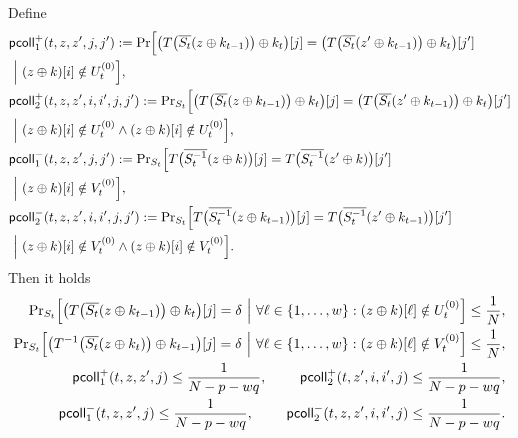 \begin{lemma}
	\label{lemma:coll-prob}
	
	Define
	\begin{align*}
	&\mathsf{pcoll}_{1}^+(t,z,z',j,j')  :={\Pr}\Big[\big(T\big(\overline{S_t}(z\oplus k_{t-1})\big)\oplus k_t\big)[j]=\big(T\big(\overline{S_t}(z'\oplus k_{t-1})\big)\oplus k_t\big)[j']       \\
	&~\Big|~(z\oplus k)[i]\notin U_t^{(0)}\Big],         \\
	&\mathsf{pcoll}_{2}^+(t,z,z',i,i',j,j')      :={\Pr}_{S_t}\Big[\big(T\big(\overline{S_t}(z\oplus k_{t-1})\big)\oplus k_t\big)[j]=\big(T\big(\overline{S_t}(z'\oplus k_{t-1})\big)\oplus k_t\big)[j']   \\
	&~\Big|~(z\oplus k)[i]\notin U_t^{(0)}\wedge(z\oplus k)[i]\notin U_t^{(0)}\Big],         \\
	&\mathsf{pcoll}_{1}^-(t,z,z',j,j')     :={\Pr}_{S_t}\Big[T\big(\overline{S_t^{-1}}(z\oplus k)\big)[j]=T\big(\overline{S_t^{-1}}(z'\oplus k)\big)[j']    \\
	&~\Big|~(z\oplus k)[i]\notin V_t^{(0)}\Big],         \\
	&\mathsf{pcoll}_{2}^-(t,z,z',i,i',j,j')    :={\Pr}_{S_t}\Big[T\big(\overline{S_t^{-1}}(z\oplus k_{t-1})\big)[j]=T\big(\overline{S_t^{-1}}(z'\oplus k_{t-1})\big)[j']     \\
	&~\Big|~(z\oplus k)[i]\notin V_t^{(0)}\wedge(z\oplus k)[i]\notin V_t^{(0)}\Big].    
	\end{align*}
	Then it holds
	\begin{align}
	{\Pr}_{S_t}\Big[\big(T\big(\overline{S_t}(z\oplus k_{t-1})\big)\oplus k_t\big)[j]=\delta ~\Big|~\forall\ell\in\{1,\ldots,w\}:(z\oplus k)[\ell]\notin U_t^{(0)}\Big]\leq\frac{1}{N},        \notag   \\
	{\Pr}_{S_t}\Big[\big(T^{-1}\big(\overline{S_t}(z\oplus k_t)\big)\oplus k_{t-1}\big)[j]=\delta ~\Big|~\forall\ell\in\{1,\ldots,w\}:(z\oplus k)[\ell]\notin V_t^{(0)}\Big]\leq\frac{1}{N},        \notag   \\
	\mathsf{pcoll}_{1}^+(t,z,z',j)\leq\frac{1}{N-p-wq}, \ \ \ \ \ \ \  \mathsf{pcoll}_{2}^+(t,z',i,i',j)\leq\frac{1}{N-p-wq},    \notag    \\
	\mathsf{pcoll}_{1}^-(t,z,z',j)\leq\frac{1}{N-p-wq}, \ \ \ \ \ \ \  \mathsf{pcoll}_{2}^-(t,z,z',i,i',j)\leq\frac{1}{N-p-wq}.    \notag
	\end{align}
\end{lemma}
